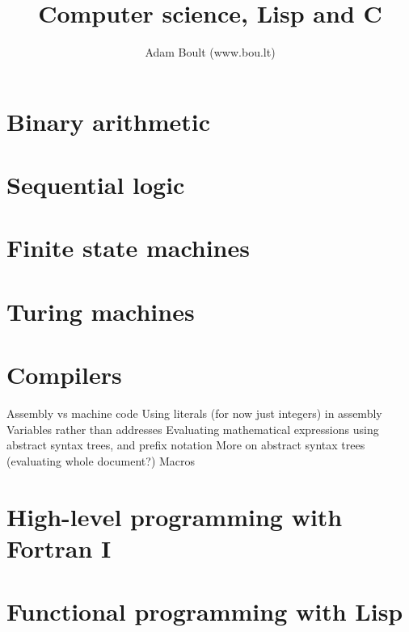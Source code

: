 \documentclass[oneside]{book}
\begin{document}
\author{Adam Boult (www.bou.lt)}
\title{Computer science, Lisp and C}
\maketitle

\setcounter{tocdepth}{0}
\tableofcontents



\part{Binary arithmetic}




\part{Sequential logic}



\part{Finite state machines}



\part{Turing machines}








\part{Compilers}
Assembly vs machine code
Using literals (for now just integers) in assembly
Variables rather than addresses
Evaluating mathematical expressions using abstract syntax trees, and prefix notation
More on abstract syntax trees (evaluating whole document?)
Macros

\part{High-level programming with Fortran I}




\part{Functional programming with Lisp}




\end{document}

